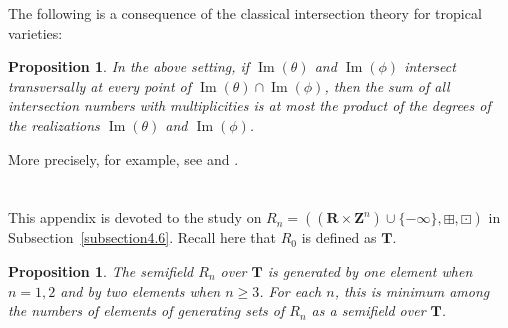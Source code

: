 \documentclass[a4paper,12pt]{amsart}
\newtheorem{prop}[dfn]{Proposition}
\begin{document}
The following is a consequence of the classical intersection theory for tropical varieties:

\begin{prop}
    \label{prop4-9-1}
In the above setting, if $\operatorname{Im}(\theta)$ and $\operatorname{Im}(\phi)$ intersect transversally at every point of $\operatorname{Im}(\theta) \cap \operatorname{Im}(\phi)$, then the sum of all intersection numbers with multiplicities is at most the product of the degrees of the realizations $\operatorname{Im}(\theta)$ and $\operatorname{Im}(\phi)$.
\end{prop}

More precisely, for example, see \cite[Subsections~3.4, 3.6, 4.6, 6.7]{Maclagan=Sturmfels} and \cite{Jensen=Yu}.

\appendix
\section{}
    \label{appendixA}

This appendix is devoted to the study on $R_n = ((\boldsymbol{R} \times \boldsymbol{Z}^n) \cup \{ -\infty \}, \boxplus, \boxdot)$ in Subsection~\ref{subsection4.6}.
Recall here that $R_0$ is defined as $\boldsymbol{T}$.

\begin{prop}
    \label{prop-appendix1}
The semifield $R_n$ over $\boldsymbol{T}$ is generated by one element when $n = 1, 2$ and by two elements when $n \ge 3$.
For each $n$, this is minimum among the numbers of elements of generating sets of $R_n$ as a semifield over $\boldsymbol{T}$.
\end{prop}
\end{document}
